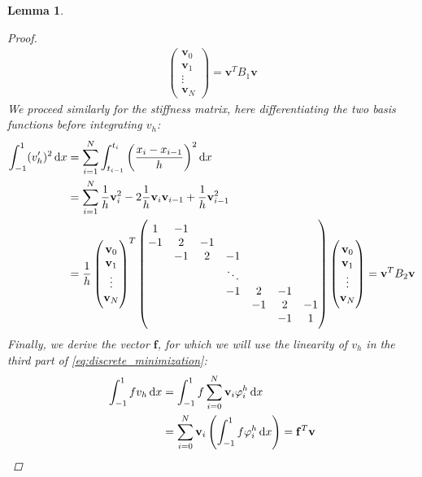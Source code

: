 \documentclass[headsepline,footsepline,footinclude=false,oneside,fontsize=11pt,paper=a4,listof=totoc,bibliography=totoc]{scrbook} %
\newtheorem{lemma}{Lemma}
\begin{document}
\begin{lemma}
\begin{proof}
\begin{align*}
\begin{pmatrix}
				\mathbf{v}_0 \\					
				\mathbf{v}_1 \\
				\vdots \\
				\mathbf{v}_N 
				\end{pmatrix} = \mathbf{v}^T B_1 \mathbf{v}
			\end{align*}
			We proceed similarly for the stiffness matrix, here differentiating the two basis functions before integrating $v_h$:
			\begin{align*}
			\int_{-1}^1 (v_h')^2 \dif x &= \sum_{i=1}^{N} \int_{t_{i-1}}^{t_i} \left(\frac{x_i-x_{i-1}}{h}\right)^2 \dif x \\
			&= \sum_{i=1}^{N} \frac{1}{h} \mathbf{v}_i^2 - 2\frac{1}{h} \mathbf{v}_i\mathbf{v}_{i-1} + \frac{1}{h}\mathbf{v}_{i-1}^2 \\
			&= \frac{1}{h} 
			\begin{pmatrix}
			\mathbf{v}_0 \\					
			\mathbf{v}_1 \\
			\vdots \\
			\mathbf{v}_N 
			\end{pmatrix}^T
			\begin{pmatrix}
			1& -1 & & & & & \\
			-1& 2& -1 & & & & \\
			& -1& 2& -1 & & & \\
			& & & \ddots & & & \\
			& & & -1& 2& -1 & \\
			& & & & -1& 2& -1 \\
			& & & & & -1& 1
			\end{pmatrix}
			\begin{pmatrix}
			\mathbf{v}_0 \\					
			\mathbf{v}_1 \\
			\vdots \\
			\mathbf{v}_N 
			\end{pmatrix} = \mathbf{v}^T B_2 \mathbf{v}
			\end{align*}
			Finally, we derive the vector $\mathbf{f}$, for which we will use the linearity of $v_h$ in the third part of \eqref{eq:discrete_minimization}:
			\begin{align*}
				\int_{-1}^1 fv_h \dif x &= \int_{-1}^1 f \sum_{i=0}^{N} \mathbf{v}_i \varphi_i^h \dif x \\
				&= \sum_{i=0}^{N} \mathbf{v}_i \left(\int_{-1}^1 f\varphi_i^h\dif x\right) = \mathbf{f}^T \mathbf{v}
			\end{align*}
		\end{proof}
\end{lemma}
\end{document}
